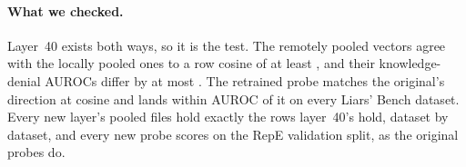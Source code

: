 \paragraph{What we checked.} Layer~40 exists both ways, so it is the test. The remotely pooled
vectors agree with the locally pooled ones to a row cosine of at least , and
their knowledge-denial AUROCs differ by at most . The retrained probe matches the
original's direction at cosine  and lands within
 AUROC of it on every Liars' Bench dataset. Every new layer's pooled
files hold exactly the rows layer~40's hold, dataset by dataset, and every new probe scores
 on the RepE validation split, as the original probes do.
